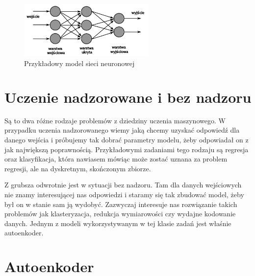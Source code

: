 \begin{figure}[h!]
    \centering
    \includegraphics[width=0.6\textwidth]{images/neural_nets}
    \caption{Przykładowy model sieci neuronowej}
    \label{fig:neural_nets}
\end{figure}

\section{Uczenie nadzorowane i bez nadzoru}

Są to dwa różne rodzaje problemów z dziedziny uczenia maszynowego. W przypadku uczenia nadzorowanego wiemy jaką chcemy uzyskać odpowiedź dla danego wejścia i próbujemy tak dobrać parametry modelu, żeby odpowiadał on z jak największą poprawnością. Przykładowymi zadaniami tego rodzaju są regresja oraz klasyfikacja, która nawiasem mówiąc może zostać uznana za problem regresji, ale na dyskretnym, skończonym zbiorze.

Z grubsza odwrotnie jest w sytuacji bez nadzoru. Tam dla danych wejściowych nie znamy interesującej nas odpowiedzi i staramy się tak zbudować model, żeby był on w stanie sam ją wydobyć. Zazwyczaj interesuje nas rozwiązanie takich problemów jak klasteryzacja, redukcja wymiarowości czy wydajne kodowanie danych. Jednym z modeli wykorzystywanym w tej klasie zadań jest właśnie autoenkoder.

\section{Autoenkoder}


